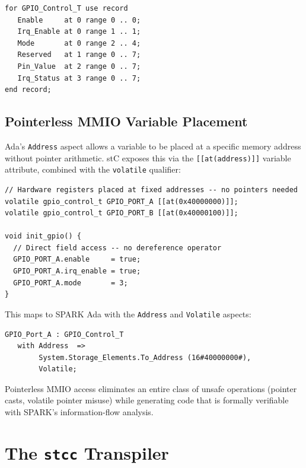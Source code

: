 \documentclass[runningheads]{llncs}
\begin{document}
\begin{lstlisting}[language=AdaCode, caption={Generated SPARK Ada representation clause}]
for GPIO_Control_T use record
   Enable     at 0 range 0 .. 0;
   Irq_Enable at 0 range 1 .. 1;
   Mode       at 0 range 2 .. 4;
   Reserved   at 1 range 0 .. 7;
   Pin_Value  at 2 range 0 .. 7;
   Irq_Status at 3 range 0 .. 7;
end record;
\end{lstlisting}

\subsection{Pointerless MMIO Variable Placement}

Ada's \texttt{Address} aspect allows a variable to be placed at a specific
memory address without pointer arithmetic. stC exposes this via the
\texttt{[[at(address)]]} variable attribute, combined with the \texttt{volatile}
qualifier:

\begin{lstlisting}[caption={Pointerless MMIO register access}]
// Hardware registers placed at fixed addresses -- no pointers needed
volatile gpio_control_t GPIO_PORT_A [[at(0x40000000)]];
volatile gpio_control_t GPIO_PORT_B [[at(0x40000100)]];

void init_gpio() {
  // Direct field access -- no dereference operator
  GPIO_PORT_A.enable     = true;
  GPIO_PORT_A.irq_enable = true;
  GPIO_PORT_A.mode       = 3;
}
\end{lstlisting}

This maps to SPARK Ada with the \texttt{Address} and \texttt{Volatile} aspects:

\begin{lstlisting}[language=AdaCode, caption={Generated SPARK Ada for MMIO variable}]
GPIO_Port_A : GPIO_Control_T
   with Address  =>
        System.Storage_Elements.To_Address (16#40000000#),
        Volatile;
\end{lstlisting}

Pointerless MMIO access eliminates an entire class of unsafe operations
(pointer casts, volatile pointer misuse) while generating code that is
formally verifiable with SPARK's information-flow analysis.

\section{The \texttt{stcc} Transpiler}
\label{sec:transpiler}
\end{document}
